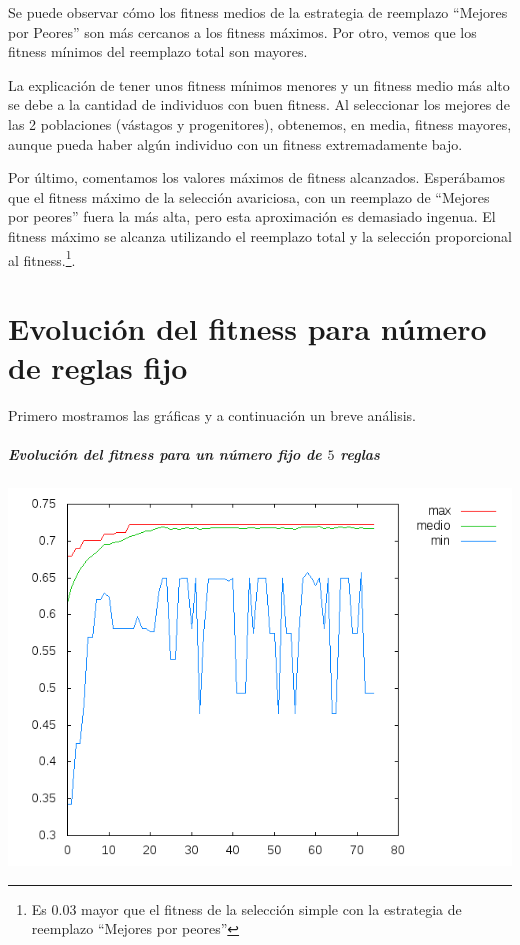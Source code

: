 \documentclass[nochap]{apuntes}
\begin{document}
Se puede observar cómo los fitness medios de la estrategia de reemplazo ``Mejores por Peores'' son más cercanos a los  fitness máximos. Por otro, vemos que los fitness mínimos del reemplazo total son mayores. 

La explicación de tener unos fitness mínimos menores y un fitness medio más alto se debe a la cantidad de individuos con buen fitness. Al seleccionar los mejores de las 2 poblaciones (vástagos y progenitores), obtenemos, en media, fitness mayores, aunque pueda haber algún individuo con un fitness extremadamente bajo. 

Por último, comentamos los valores máximos de fitness alcanzados. Esperábamos que el fitness máximo de la selección avariciosa, con un reemplazo de ``Mejores por peores'' fuera la más alta, pero esta aproximación es demasiado ingenua. El fitness máximo se alcanza utilizando el reemplazo total y la selección proporcional al fitness.\footnote{Es 0.03 mayor que el fitness de la selección simple con la estrategia de reemplazo ``Mejores por peores''}. 



\appendix


\chapter{Evolución del fitness para número de reglas fijo}

Primero mostramos las gráficas y a continuación un breve análisis.
\paragraph{Evolución del fitness para un número fijo de $5$ reglas}
\begin{center}
\includegraphics[scale=0.6]{tex/img/g75_p75_MejoresPorPeores_SeleccionProporcionalAlFitness_reg5.png}
\end{center}
\end{document}
